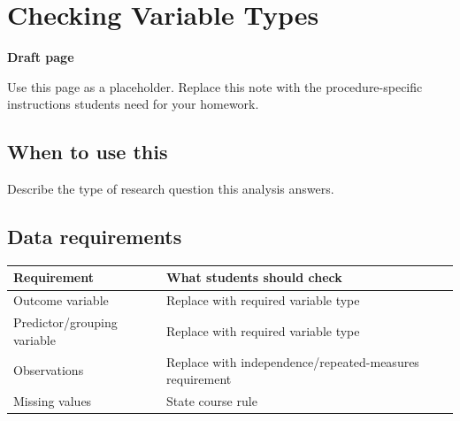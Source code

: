 \documentclass[
  letterpaper,
  DIV=11,
  numbers=noendperiod]{scrreprt}
\newcounter{none} %
\begin{document}
\chapter{Checking Variable Types}\label{checking-variable-types}

\begin{tcolorbox}[enhanced jigsaw, arc=.35mm, bottomrule=.15mm, breakable, colback=white, colframe=quarto-callout-note-color-frame, left=2mm, leftrule=.75mm, opacityback=0, rightrule=.15mm, toprule=.15mm]
\begin{minipage}[t]{5.5mm}
\textcolor{quarto-callout-note-color}{\faInfo}
\end{minipage}%
\begin{minipage}[t]{\textwidth - 5.5mm}

\vspace{-3mm}\textbf{Draft page}\vspace{3mm}

Use this page as a placeholder. Replace this note with the
procedure-specific instructions students need for your homework.

\end{minipage}%
\end{tcolorbox}

\section{When to use this}\label{when-to-use-this-2}

Describe the type of research question this analysis answers.

\section{Data requirements}\label{data-requirements-2}

{\def\LTcaptype{none} %
\begin{longtable}[]{@{}
  >{\raggedright\arraybackslash}p{}
  >{\raggedright\arraybackslash}p{}@{}}
\toprule\noalign{}
\begin{minipage}[b]{\linewidth}\raggedright
Requirement
\end{minipage} & \begin{minipage}[b]{\linewidth}\raggedright
What students should check
\end{minipage} \\
\midrule\noalign{}
\endhead
\bottomrule\noalign{}
\endlastfoot
Outcome variable & Replace with required variable type \\
Predictor/grouping variable & Replace with required variable type \\
Observations & Replace with independence/repeated-measures
requirement \\
Missing values & State course rule \\
\end{longtable}
}
\end{document}
